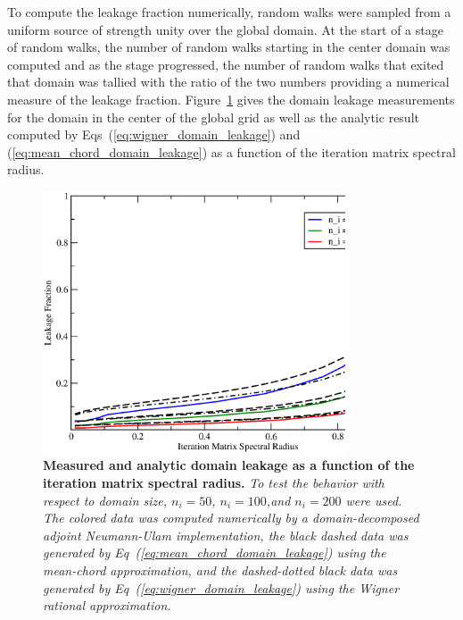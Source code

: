 \documentclass[preprint,11pt]{elsarticle}
\begin{document}
To compute the leakage fraction numerically,  random walks were
sampled from a uniform source of strength unity over the global domain. At the
start of a stage of random walks, the number of random walks starting in the
center domain was computed and as the stage progressed, the number of random
walks that exited that domain was tallied with the ratio of the two numbers
providing a numerical measure of the leakage
fraction. Figure~\ref{fig:measured_leakage} gives the domain leakage
measurements for the domain in the center of the global grid as well as the
analytic result computed by Eqs~(\ref{eq:wigner_domain_leakage}) and
(\ref{eq:mean_chord_domain_leakage}) as a function of the iteration matrix
spectral radius.
\begin{figure}[ht!]
  \begin{center}
    \includegraphics[width=0.8\textwidth]{leakage_fraction.eps}
  \end{center}
  \caption{\textbf{Measured and analytic domain leakage as a function of the
      iteration matrix spectral radius.} \textit{To test the behavior with
      respect to domain size, $n_i=50$, $n_i=100$,and $n_i=200$ were used. The
      colored data was computed numerically by a domain-decomposed adjoint
      Neumann-Ulam implementation, the black dashed data was generated by
      Eq~(\ref{eq:mean_chord_domain_leakage}) using the mean-chord
      approximation, and the dashed-dotted black data was generated by
      Eq~(\ref{eq:wigner_domain_leakage}) using the Wigner rational
      approximation.}}
  \label{fig:measured_leakage}
\end{figure}
\end{document}
